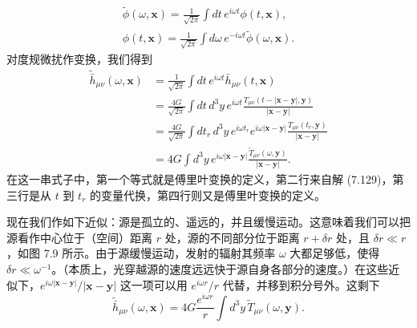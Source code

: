 \begin{gather*}
\widetilde{\phi}(\omega, \mathbf{x}) = \frac{1}{\sqrt{2\pi}}\int dt\, e^{i\omega t}\phi(t, \mathbf{x}), \\
\phi(t, \mathbf{x}) = \frac{1}{\sqrt{2\pi}}\int d\omega\, e^{-i\omega t}\widetilde{\phi}(\omega, \mathbf{x}).
\tag{7.131}
\end{gather*}
对度规微扰作变换，我们得到
\begin{align*}
\widetilde{\bar{h}}_{\mu\nu}(\omega, \mathbf{x}) &= \frac{1}{\sqrt{2\pi}}\int dt\, e^{i\omega t}\bar{h}_{\mu\nu}(t, \mathbf{x}) \\
&= \frac{4G}{\sqrt{2\pi}}\int dt\, d^{3}y\, e^{i\omega t}\frac{T_{\mu\nu}(t - |\mathbf{x}-\mathbf{y}|, \mathbf{y})}{|\mathbf{x}-\mathbf{y}|} \\
&= \frac{4G}{\sqrt{2\pi}}\int dt_r\, d^{3}y\, e^{i\omega t_r}e^{i\omega|\mathbf{x}-\mathbf{y}|}\frac{T_{\mu\nu}(t_r, \mathbf{y})}{|\mathbf{x}-\mathbf{y}|} \\
&= 4G\int d^{3}y\, e^{i\omega|\mathbf{x}-\mathbf{y}|}\frac{\widetilde{T}_{\mu\nu}(\omega, \mathbf{y})}{|\mathbf{x}-\mathbf{y}|}.
\tag{7.132}
\end{align*}
在这一串式子中，第一个等式就是傅里叶变换的定义，第二行来自解 (7.129)，第三行是从 $t$ 到 $t_r$ 的变量代换，第四行则又是傅里叶变换的定义。

现在我们作如下近似：源是孤立的、遥远的，并且缓慢运动。这意味着我们可以把源看作中心位于（空间）距离 $r$ 处，源的不同部分位于距离 $r + \delta r$ 处，且 $\delta r \ll r$，如图 7.9 所示。由于源缓慢运动，发射的辐射其频率 $\omega$ 大都足够低，使得 $\delta r \ll \omega^{-1}$。（本质上，光穿越源的速度远远快于源自身各部分的速度。）在这些近似下，$e^{i\omega|\mathbf{x}-\mathbf{y}|}/|\mathbf{x}-\mathbf{y}|$ 这一项可以用 $e^{i\omega r}/r$ 代替，并移到积分号外。这剩下
\begin{equation*}
\widetilde{\bar{h}}_{\mu\nu}(\omega, \mathbf{x}) = 4G\frac{e^{i\omega r}}{r}\int d^{3}y\, \widetilde{T}_{\mu\nu}(\omega, \mathbf{y}).
\tag{7.133}
\end{equation*}




